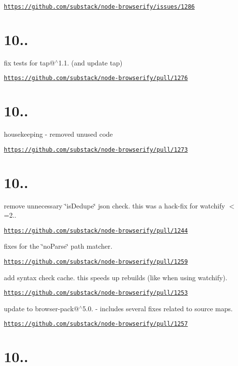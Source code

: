 \href{https://github.com/substack/node-browserify/issues/1286}{\tt https\+://github.\+com/substack/node-\/browserify/issues/1286}

\section*{10..}

fix tests for tap@$^\wedge$1.1. (and update tap)

\href{https://github.com/substack/node-browserify/pull/1276}{\tt https\+://github.\+com/substack/node-\/browserify/pull/1276}

\section*{10..}

housekeeping -\/ removed unused code

\href{https://github.com/substack/node-browserify/pull/1273}{\tt https\+://github.\+com/substack/node-\/browserify/pull/1273}

\section*{10..}

remove unnecessary \char`\"{}is\+Dedupe\char`\"{} json check. this was a hack-\/fix for watchify $<$=2..

\href{https://github.com/substack/node-browserify/pull/1244}{\tt https\+://github.\+com/substack/node-\/browserify/pull/1244}

fixes for the \char`\"{}no\+Parse\char`\"{} path matcher.

\href{https://github.com/substack/node-browserify/pull/1259}{\tt https\+://github.\+com/substack/node-\/browserify/pull/1259}

add syntax check cache. this speeds up rebuilds (like when using watchify).

\href{https://github.com/substack/node-browserify/pull/1253}{\tt https\+://github.\+com/substack/node-\/browserify/pull/1253}

update to browser-\/pack@$^\wedge$5.0. -\/ includes several fixes related to source maps.

\href{https://github.com/substack/node-browserify/pull/1257}{\tt https\+://github.\+com/substack/node-\/browserify/pull/1257}

\section*{10..}

